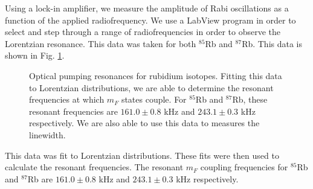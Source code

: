 Using a lock-in amplifier, we measure the amplitude of Rabi oscillations as a function of the applied radiofrequency.  We use a LabView program in order to select and step through a range of radiofrequencies in order to observe the Lorentzian resonance.  This data was taken for both $^{85}$Rb and $^{87}$Rb. This data is shown in Fig. \ref{fig:rawcurve}.    
\begin{figure}[h!]
\begin{center}
\hspace{-1mm}
\vspace{-2mm}
\vspace{-2mm}
\caption{\small{Optical pumping resonances for rubidium isotopes. Fitting this data to Lorentzian distributions, we are able to determine the resonant frequencies at which $m_F$ states couple. For $^{85}$Rb and $^{87}$Rb, these resonant frequencies are $161.0 \pm 0.8$ kHz and $243.1\pm 0.3$ kHz respectively. We are also able to use this data to measures the linewidth.}}
\label{fig:rawcurve}
\end{center}
\end{figure}
This data was fit to Lorentzian distributions. These fits were then used to calculate the resonant frequencies.  The resonant $m_F$ coupling frequencies for $^{85}$Rb and $^{87}$Rb are $161.0 \pm 0.8$ kHz and $243.1\pm 0.3$ kHz respectively.  

